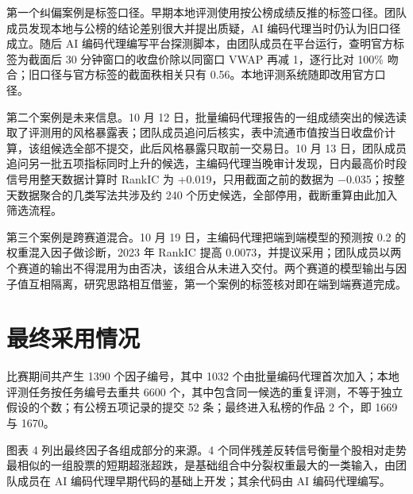 \documentclass[UTF8,a4paper,zihao=-4,fontset=none]{ctexart}
\begin{document}
第一个纠偏案例是标签口径。早期本地评测使用按公榜成绩反推的标签口径。团队成员发现本地与公榜的结论差别很大并提出质疑，AI 编码代理当时仍认为旧口径成立。随后 AI 编码代理编写平台探测脚本，由团队成员在平台运行，查明官方标签为截面后 30 分钟窗口的收盘价除以同窗口 VWAP 再减 1，逐行比对 100\% 吻合；旧口径与官方标签的截面秩相关只有 0.56。本地评测系统随即改用官方口径。

第二个案例是未来信息。10 月 12 日，批量编码代理报告的一组成绩突出的候选读取了评测用的风格暴露表；团队成员追问后核实，表中流通市值按当日收盘价计算，该组候选全部不提交，此后风格暴露只取前一交易日。10 月 13 日，团队成员追问另一批五项指标同时上升的候选，主编码代理当晚审计发现，日内最高价时段信号用整天数据计算时 RankIC 为 +0.019，只用截面之前的数据为 −0.035；按整天数据聚合的几类写法共涉及约 240 个历史候选，全部停用，截断重算由此加入筛选流程。

第三个案例是跨赛道混合。10 月 19 日，主编码代理把端到端模型的预测按 0.2 的权重混入因子做诊断，2023 年 RankIC 提高 0.0073，并提议采用；团队成员以两个赛道的输出不得混用为由否决，该组合从未进入交付。两个赛道的模型输出与因子值互相隔离，研究思路相互借鉴，第一个案例的标签核对即在端到端赛道完成。

\section{最终采用情况}

比赛期间共产生 1390 个因子编号，其中 1032 个由批量编码代理首次加入；本地评测任务按任务编号去重共 6600 个，其中包含同一候选的重复评测，不等于独立假设的个数；有公榜五项记录的提交 52 条；最终进入私榜的作品 2 个，即 1669 与 1670。

图表 4 列出最终因子各组成部分的来源。4 个同伴残差反转信号衡量个股相对走势最相似的一组股票的短期超涨超跌，是基础组合中分裂权重最大的一类输入，由团队成员在 AI 编码代理早期代码的基础上开发；其余代码由 AI 编码代理编写。
\end{document}
